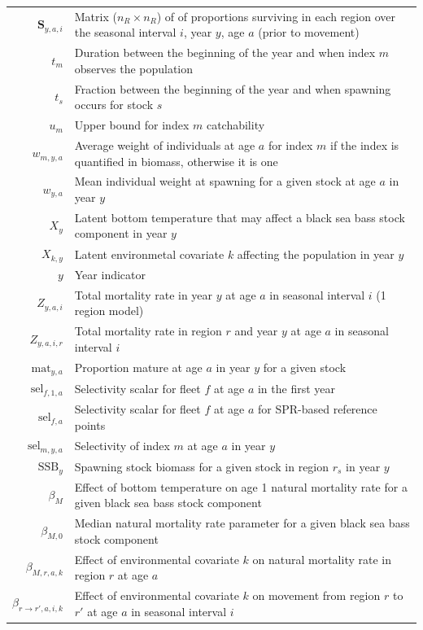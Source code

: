 \documentclass[
]{article}
\begin{document}
\begin{longtable}[c]{r p{}}
$\mathbf{S}_{y,a,i}$ & Matrix ($n_R \times n_R$) of of proportions surviving in each region over the seasonal interval $i$, year $y$, age $a$ (prior to movement)\\
$t_m$ & Duration between the beginning of the year and when index $m$ observes the population\\
$t_s$ & Fraction between the beginning of the year and when spawning occurs for stock $s$\\
$u_{m}$ & Upper bound for index $m$ catchability\\
$w_{m,y,a}$ & Average weight of individuals at age $a$ for index $m$ if the index is quantified in biomass, otherwise it is one\\
$w_{y,a}$ & Mean individual weight at spawning for a given stock at age $a$ in year $y$\\
$X_{y}$ & Latent bottom temperature that may affect a black sea bass stock component in year $y$\\
$X_{k,y}$ & Latent environmetal covariate $k$ affecting the population in year $y$\\
$y$ & Year indicator\\
$Z_{y,a,i}$ & Total mortality rate in year $y$ at age $a$ in seasonal interval $i$ (1 region model)\\
$Z_{y,a,i,r}$ & Total mortality rate in region $r$ and year $y$ at age $a$ in seasonal interval $i$\\
$\text{mat}_{y,a}$ & Proportion mature at age $a$ in year $y$ for a given stock\\
$\text{sel}_{f,1,a}$ & Selectivity scalar for fleet $f$ at age $a$ in the first year\\
$\text{sel}_{f,a}$ & Selectivity scalar for fleet $f$ at age $a$ for SPR-based reference points\\
$\text{sel}_{m,y,a}$ &  Selectivity of index $m$ at age $a$ in year $y$ \\
$\text{SSB}_{y}$ & Spawning stock biomass for a given stock in region $r_s$ in year $y$\\
$\beta_M$ & Effect of bottom temperature on age 1 natural mortality rate for a given black sea bass stock component\\
$\beta_{M,0}$ & Median natural mortality rate parameter for a given black sea bass stock component\\
$\beta_{M,r,a,k}$ & Effect of environmental covariate $k$ on natural mortality rate in region $r$ at age $a$\\
$\beta_{r \rightarrow r',a,i,k}$ & Effect of environmental covariate $k$ on movement from region $r$ to $r'$ at age $a$ in seasonal interval $i$\\

\end{longtable}
\end{document}
